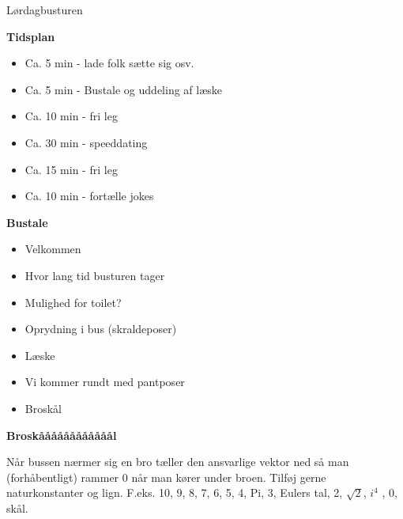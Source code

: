 \begin{mats}{Lørdag}{busturen}
\end{mats}

\textbf{Tidsplan}
\begin{itemize}
    \item Ca. 5 min - lade folk sætte sig osv.
    \item Ca. 5 min - Bustale og uddeling af læske
    \item Ca. 10 min - fri leg
    \item Ca. 30 min - speeddating
    \item Ca. 15 min - fri leg
    \item Ca. 10 min - fortælle jokes
\end{itemize}

\textbf{Bustale}
\begin{itemize}
    \item Velkommen
    \item Hvor lang tid busturen tager
    \item Mulighed for toilet?
    \item Oprydning i bus (skraldeposer)
    \item Læske
    \item Vi kommer rundt med pantposer
    \item Broskål
\end{itemize}

\textbf{Broskåååååååååååål}

Når bussen nærmer sig en bro tæller den ansvarlige vektor ned så man (forhåbentligt) rammer 0 når man kører under broen. Tilføj gerne naturkonstanter og lign. F.eks. 10, 9, 8, 7, 6, 5, 4, Pi, 3, Eulers tal, 2, $\sqrt{2}$, $i^4$ , 0, skål.

